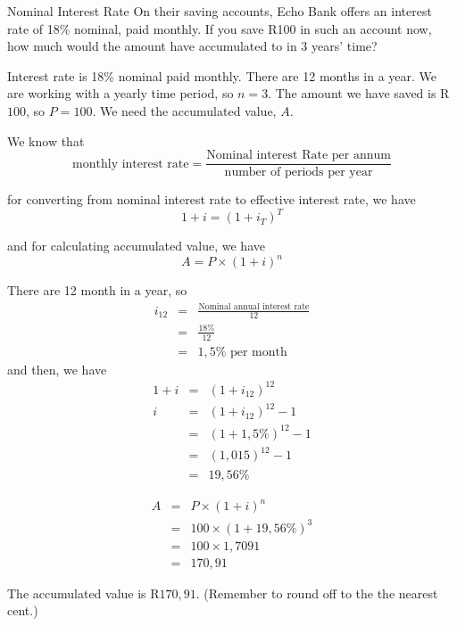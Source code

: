 \begin{wex}{Nominal Interest Rate}
{On their saving accounts, Echo Bank offers an interest rate of 18\% nominal,
paid monthly. If you save R100 in such an account now, how much would the amount
have accumulated to in 3 years' time?}
{
Interest rate is 18\%
nominal paid monthly. There are 12 months in a year. We are working with a
yearly time period, so $n = 3$. The amount we have saved is R$100$, so $P =
100$. We need the accumulated value, $A$.

 We know that
\begin{displaymath}
\textrm{monthly interest rate} =
\frac{\textrm{Nominal interest Rate per annum}}{\textrm{number of periods per
year}}
\end{displaymath}

for converting from nominal interest rate to effective interest rate, we have
\begin{displaymath}
	1 + i = (1 + i_T)^T
\end{displaymath}

and for calculating accumulated value, we have
\begin{displaymath}
	A = P \times (1 + i)^n
\end{displaymath}
	
There are 12 month in a year, so
\begin{eqnarray*}
	i_{12} &=& \frac{\textrm{Nominal annual interest rate}}{12}\\
	&=& \frac{18\%}{12}\\
	&=& 1,5\% \textrm{ per month}
\end{eqnarray*}
and then, we have
\begin{eqnarray*}
	1 + i &=& (1 + i_{12})^{12}\\
	i &=& (1 + i_{12})^{12} - 1\\
	&=& (1 + 1,5\%)^{12} - 1\\
	&=& (1,015)^{12} - 1\\
	&=& 19,56\%
\end{eqnarray*}

\begin{eqnarray*}
	A &=& P \times (1 + i)^n\\
	&=& 100 \times (1 + 19,56\%)^3\\
	&=& 100 \times 1,7091\\
	&=& 170,91
\end{eqnarray*}

The accumulated value is R$170,91$. (Remember to round off to the the nearest
cent.)
}
\end{wex}

